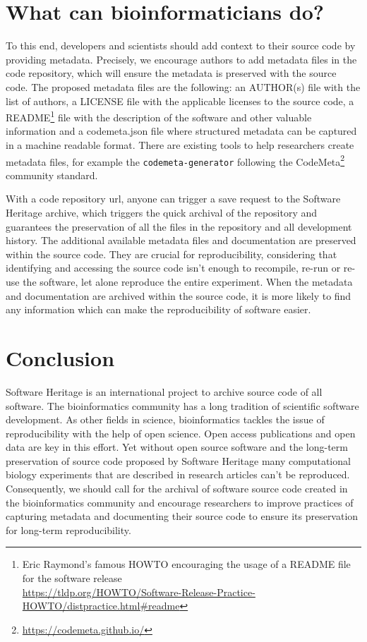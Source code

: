 \documentclass[long, final]{jobim}
\begin{document}
\section{What can bioinformaticians do?}

To this end, developers and scientists should add context to their source code by providing metadata. Precisely, we encourage authors to add metadata files in the code repository, which will ensure the metadata is preserved with the source code. The proposed metadata files are the following: an AUTHOR(s) file with the list of authors, a LICENSE file with the applicable licenses to the source code, a README\footnote{Eric Raymond's famous HOWTO encouraging the usage of a README file for the software release\\ 
\url{ https://tldp.org/HOWTO/Software-Release-Practice-HOWTO/distpractice.html\#readme}} file with the description of the software and other valuable information and a codemeta.json file where structured metadata can be captured in a machine readable format. There are existing tools to help researchers create metadata files, for example the \texttt{codemeta-generator}\cite{codemetagenerator} following the CodeMeta\footnote{\url{https://codemeta.github.io/}} community standard. 

With a code repository url, anyone can trigger a save request to the Software Heritage archive, which triggers the quick archival of the repository and guarantees the preservation of all the files in the repository and all development history. The additional available metadata files and documentation are preserved within the source code. They are crucial for reproducibility, considering that identifying and accessing the source code isn’t enough to recompile, re-run or re-use the software, let alone reproduce the entire experiment. When the metadata and documentation are archived within the source code, it is more likely to find any information which can make the reproducibility of software easier.


\section{Conclusion}

Software Heritage is an international project to archive source code of all software. The bioinformatics community has a long tradition of scientific software development. As other fields in science, bioinformatics tackles the issue of reproducibility with the help of open science. Open access publications and open data are key in this effort. Yet without open source software and the long-term preservation of source code proposed by Software Heritage many computational biology experiments that are described in research articles can’t be reproduced. Consequently, we should call for the archival of software source code created in the bioinformatics community and encourage researchers to improve practices of capturing metadata and documenting their source code to ensure its preservation for long-term reproducibility.

\printbibheading[title=References]

\printbibliography[heading=subbibliography,notkeyword={issoftware},title={Articles}]
\printbibliography[heading=subbibliography,keyword={issoftware},title={Software Projects}]
\end{document}
